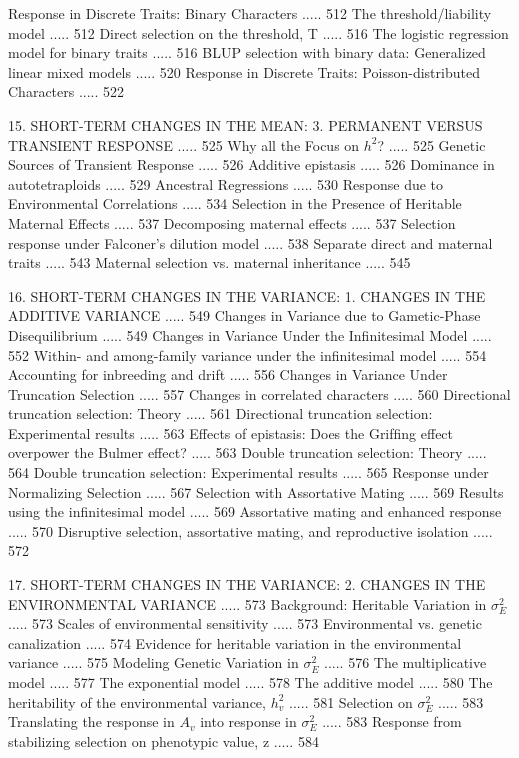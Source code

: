 \documentclass{article}
\begin{document}
Response in Discrete Traits: Binary Characters ..... 512
The threshold/liability model ..... 512
Direct selection on the threshold, T ..... 516
The logistic regression model for binary traits ..... 516
BLUP selection with binary data: Generalized linear mixed models ..... 520
Response in Discrete Traits: Poisson-distributed Characters ..... 522

15. SHORT-TERM CHANGES IN THE MEAN:
3. PERMANENT VERSUS TRANSIENT RESPONSE ..... 525
Why all the Focus on  $ h^{2} $? ..... 525
Genetic Sources of Transient Response ..... 526
Additive epistasis ..... 526
Dominance in autotetraploids ..... 529
Ancestral Regressions ..... 530
Response due to Environmental Correlations ..... 534
Selection in the Presence of Heritable Maternal Effects ..... 537
Decomposing maternal effects ..... 537
Selection response under Falconer's dilution model ..... 538
Separate direct and maternal traits ..... 543
Maternal selection vs. maternal inheritance ..... 545

16. SHORT-TERM CHANGES IN THE VARIANCE:
1. CHANGES IN THE ADDITIVE VARIANCE ..... 549
Changes in Variance due to Gametic-Phase Disequilibrium ..... 549
Changes in Variance Under the Infinitesimal Model ..... 552
Within- and among-family variance under the infinitesimal model ..... 554
Accounting for inbreeding and drift ..... 556
Changes in Variance Under Truncation Selection ..... 557
Changes in correlated characters ..... 560
Directional truncation selection: Theory ..... 561
Directional truncation selection: Experimental results ..... 563
Effects of epistasis: Does the Grifﬁng effect overpower the Bulmer effect? ..... 563
Double truncation selection: Theory ..... 564
Double truncation selection: Experimental results ..... 565
Response under Normalizing Selection ..... 567
Selection with Assortative Mating ..... 569
Results using the infinitesimal model ..... 569
Assortative mating and enhanced response ..... 570
Disruptive selection, assortative mating, and reproductive isolation ..... 572

17. SHORT-TERM CHANGES IN THE VARIANCE:
2. CHANGES IN THE ENVIRONMENTAL VARIANCE ..... 573
Background: Heritable Variation in  $ \sigma_{E}^{2} $ ..... 573
Scales of environmental sensitivity ..... 573
Environmental vs. genetic canalization ..... 574
Evidence for heritable variation in the environmental variance ..... 575
Modeling Genetic Variation in  $ \sigma_{E}^{2} $ ..... 576
The multiplicative model ..... 577
The exponential model ..... 578
The additive model ..... 580
The heritability of the environmental variance,  $ h_{v}^{2} $ ..... 581
Selection on  $ \sigma_{E}^{2} $ ..... 583
Translating the response in  $ A_{v} $ into response in  $ \sigma_{E}^{2} $ ..... 583
Response from stabilizing selection on phenotypic value, z ..... 584
\end{document}
